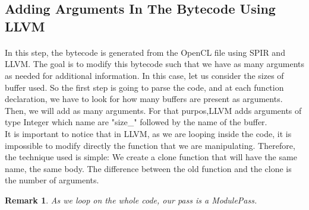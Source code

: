\documentclass{article}
\newtheorem*{remark}{Remark}
\begin{document}
\begin{itemize}

\subsection{Adding Arguments In The Bytecode Using LLVM}

\paragraph{}
In this step, the bytecode is generated from the OpenCL file using SPIR and LLVM. The goal is to modify this bytecode such that we have as many arguments as needed for additional information. In this case, let us consider the sizes of buffer used. So the first step is going to parse the code, and at each function declaration, we have to look for how many buffers are present as arguments. Then, we will add as many arguments. For that purpos,LLVM adds arguments of type Integer which name are "size\_" followed by the name of the buffer.\\   
It is important to notice that in LLVM, as we are looping inside the code, it is impossible to modify directly the function that we are manipulating. Therefore, the technique used is simple: We create a clone function that will have the same name, the same body. The difference between the old function and the clone is the number of arguments.

\begin{remark}
As we loop on the whole code, our pass is a ModulePass.
\end{remark}


\end{itemize}
\end{document}
